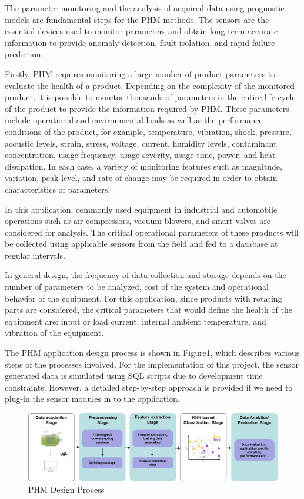 \documentclass[sigconf]{acmart}
\begin{document}
The parameter monitoring and the analysis of acquired data using prognostic models are fundamental steps for the PHM methods. The sensors are the essential devices used to monitor parameters and obtain long-term accurate information to provide anomaly detection, fault isolation, and rapid failure prediction \cite{Shunfeng2010}.

Firstly, PHM requires monitoring a large number of product parameters to evaluate the health of a product. Depending on the complexity of the monitored product, it is possible to monitor thousands of parameters in the entire life cycle of the product to provide the information required by PHM. These parameters include operational and environmental loads as well as the performance conditions of the product, for example, temperature, vibration, shock, pressure, acoustic levels, strain, stress, voltage, current, humidity levels, contaminant concentration, usage frequency, usage severity, usage time, power, and heat dissipation. In each case, a variety of monitoring features such as magnitude, variation, peak level, and rate of change may be required in order to obtain characteristics of parameters.

In this application, commonly used equipment in industrial and automobile operations such as air compressors, vacuum blowers, and smart valves are considered for analysis. The critical operational parameters of these products will be collected using applicable sensors from the field and fed to a database at regular intervals.

In general design, the frequency of data collection and storage depends on the number of parameters to be analyzed, cost of the system and operational behavior of the equipment. For this application, since products with rotating parts are considered, the critical parameters that would define the health of the equipment are: input or load current, internal ambient temperature, and vibration of the equipment.

The PHM application design process is shown in Figure1, which describes various steps of the processes involved. For the implementation of this project, the sensor generated data is simulated using SQL scripts due to development time constraints. However, a detailed step-by-step approach is provided if we need to plug-in the sensor modules in to the application.



\begin{figure}
\includegraphics[width=1.0\columnwidth]{images/phm_process_1}
\caption{PHM Design Process} \label{fig:Figure1}
\end{figure}
\end{document}
